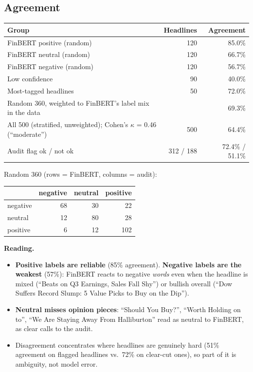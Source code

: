 \documentclass[11pt]{article}
\begin{document}
\subsection{Agreement}
\begin{center}\small
\begin{tabular}{@{}lrr@{}}
\toprule
Group & Headlines & Agreement\\
\midrule
FinBERT positive (random) & 120 & 85.0\%\\
FinBERT neutral (random) & 120 & 66.7\%\\
FinBERT negative (random) & 120 & 56.7\%\\
Low confidence & 90 & 40.0\%\\
Most-tagged headlines & 50 & 72.0\%\\
\midrule
Random 360, weighted to FinBERT's label mix in the data & & 69.3\%\\
All 500 (stratified, unweighted); Cohen's $\kappa$ = 0.46 (``moderate'') & 500 & 64.4\%\\
Audit flag ok / not ok & 312 / 188 & 72.4\% / 51.1\%\\
\bottomrule
\end{tabular}

\smallskip
Random 360 (rows = FinBERT, columns = audit):\quad
\begin{tabular}{@{}lrrr@{}}
\toprule
 & negative & neutral & positive\\
\midrule
negative & 68 & 30 & 22\\
neutral & 12 & 80 & 28\\
positive & 6 & 12 & 102\\
\bottomrule
\end{tabular}
\end{center}

\textbf{Reading.}
\begin{itemize}
  \item \textbf{Positive labels are reliable} (85\% agreement). \textbf{Negative labels are the weakest} (57\%): FinBERT reacts to negative \emph{words} even when the headline is mixed (``Beats on Q3 Earnings, Sales Fall Shy'') or bullish overall (``Dow Suffers Record Slump: 5 Value Picks to Buy on the Dip'').
  \item \textbf{Neutral misses opinion pieces}: ``Should You Buy?'', ``Worth Holding on to'', ``We Are Staying Away From Halliburton'' read as neutral to FinBERT, as clear calls to the audit.
  \item Disagreement concentrates where headlines are genuinely hard (51\% agreement on flagged headlines vs.\ 72\% on clear-cut ones), so part of it is ambiguity, not model error.
\end{itemize}
\end{document}
